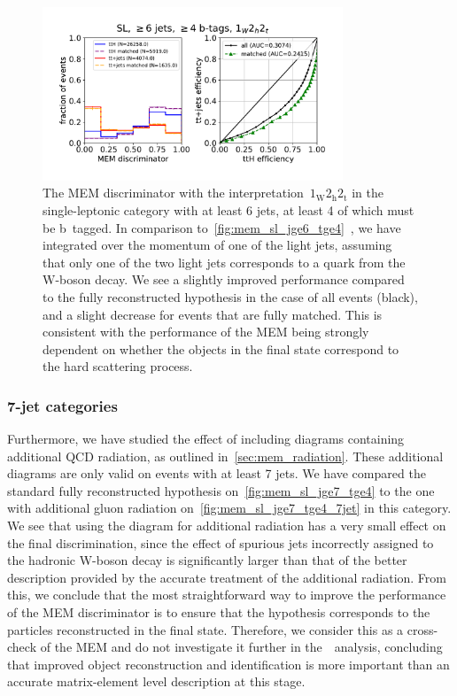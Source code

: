 \begin{figure}[ht]
\begin{centering}
\includegraphics[width = 0.8\textwidth]{figures/mem/mem_sl_jge6_tge4_1w2h2t.pdf}
\caption[MEM with the~$1_{\mathrm{W}} 2_{\mathrm{h}} 2_{\mathrm{t}}$ interpretation in the $\ge6$ jet, $\ge4$ b~tag category]{The MEM discriminator with the interpretation~$1_{\mathrm{W}} 2_{\mathrm{h}} 2_{\mathrm{t}}$ in the single-leptonic category with at least 6 jets, at least 4 of which must be b~tagged. In comparison to~\cref{fig:mem_sl_jge6_tge4}~, we have integrated over the momentum of one of the light jets, assuming that only one of the two light jets corresponds to a quark from the~$\mathrm{W}$-boson decay. We see a slightly improved performance compared to the fully reconstructed hypothesis in the case of all events (black), and a slight decrease for events that are fully matched. This is consistent with the performance of the MEM being strongly dependent on whether the objects in the final state correspond to the hard scattering process.}
\label{fig:mem_sl_jge6_tge4_1w2h2t}
\end{centering}
\end{figure}

\subsubsection{7-jet categories}
Furthermore, we have studied the effect of including diagrams containing additional QCD radiation, as outlined in~\cref{sec:mem_radiation}. These additional diagrams are only valid on events with at least 7 jets. We have compared the standard fully reconstructed hypothesis on~\cref{fig:mem_sl_jge7_tge4} to the one with additional gluon radiation on~\cref{fig:mem_sl_jge7_tge4_7jet} in this category. We see that using the diagram for additional radiation has a very small effect on the final discrimination, since the effect of spurious jets incorrectly assigned to the hadronic W-boson decay is significantly larger than that of the better description provided by the accurate treatment of the additional radiation. From this, we conclude that the most straightforward way to improve the performance of the MEM discriminator is to ensure that the hypothesis corresponds to the particles reconstructed in the final state. Therefore, we consider this as a cross-check of the MEM and do not investigate it further in the~\ttHbb\ analysis, concluding that improved object reconstruction and identification is more important than an accurate matrix-element level description at this stage.

